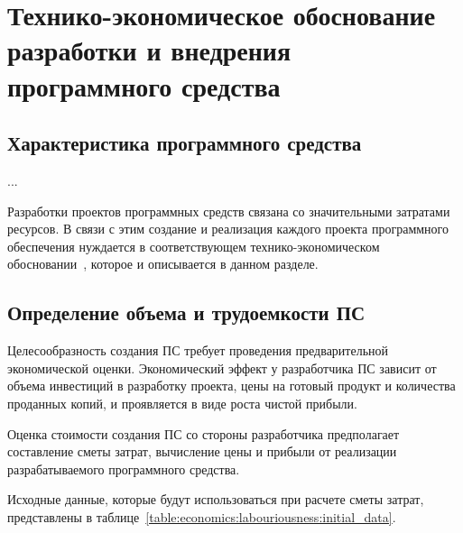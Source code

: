 


\section{Технико-экономическое обоснование разработки и внедрения программного средства}
\label{sec:economics}

\subsection{Характеристика программного средства}
\label{sec:economics:description}

...

Разработки проектов программных средств связана со значительными затратами ресурсов. В связи с этим создание и реализация каждого проекта программного обеспечения нуждается в соответствующем технико-экономическом обосновании~\cite{palitsyn}, которое и описывается в данном разделе.

\subsection{Определение объема и трудоемкости ПС}
\label{sec:economics:labouriousness}

Целесообразность создания ПС требует проведения предварительной экономической оценки. Экономический эффект у разработчика ПС зависит от объема инвестиций в разработку проекта, цены на готовый продукт и количества проданных копий, и проявляется в виде роста чистой прибыли. 

Оценка стоимости создания ПС со стороны разработчика предполагает составление сметы затрат, вычисление цены и прибыли от реализации разрабатываемого программного средства. 

Исходные данные, которые будут использоваться при расчете сметы затрат, представлены в таблице~\ref{table:economics:labouriousness:initial_data}.

